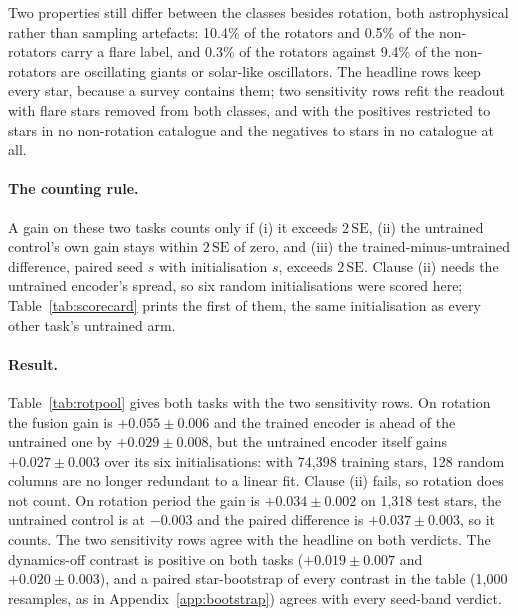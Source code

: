 \documentclass{article}
\begin{document}
Two properties still differ between the classes besides rotation, both astrophysical rather than
sampling artefacts: 10.4\% of the rotators and 0.5\% of the non-rotators carry a flare label, and
0.3\% of the rotators against 9.4\% of the non-rotators are oscillating giants or solar-like
oscillators. The headline rows keep every star, because a survey contains them; two sensitivity rows
refit the readout with flare stars removed from both classes, and with the positives restricted to
stars in no non-rotation catalogue and the negatives to stars in no catalogue at all.

\paragraph{The counting rule.} A gain on these two tasks counts only if (i) it exceeds
$2\,\mathrm{SE}$, (ii) the untrained control's own gain stays within $2\,\mathrm{SE}$ of zero, and
(iii) the trained-minus-untrained difference, paired seed $s$ with initialisation $s$, exceeds
$2\,\mathrm{SE}$. Clause (ii) needs the untrained encoder's spread, so six random initialisations
were scored here; Table~\ref{tab:scorecard} prints the first of them, the same initialisation as
every other task's untrained arm.

\paragraph{Result.} Table~\ref{tab:rotpool} gives both tasks with the two sensitivity rows. On
rotation the fusion gain is $+0.055 \pm 0.006$ and the trained encoder is ahead of the untrained one
by $+0.029 \pm 0.008$, but the untrained encoder itself gains $+0.027 \pm 0.003$ over its six
initialisations: with 74{,}398 training stars, 128 random columns are no longer redundant to a linear
fit. Clause (ii) fails, so rotation does not count. On rotation period the gain is $+0.034 \pm 0.002$
on 1{,}318 test stars, the untrained control is at $-0.003$ and the paired difference is
$+0.037 \pm 0.003$, so it counts. The two sensitivity rows agree with the headline on both verdicts.
The dynamics-off contrast is positive on both tasks ($+0.019 \pm 0.007$ and $+0.020 \pm 0.003$), and
a paired star-bootstrap of every contrast in the table (1{,}000 resamples, as in
Appendix~\ref{app:bootstrap}) agrees with every seed-band verdict.

\begin{table}[H]
\caption{The two rotation tasks on the rotation pool. The ``all stars'' rows are those of
Table~\ref{tab:scorecard}; linear and XGBoost readouts and the two supervised baselines are as there.
Gain = features\,$\oplus\,\mu$ minus features, mean over six encoder seeds, bold beyond
$2\,\mathrm{SE}$; untrained gain = the same with the untrained encoder. Sensitivity rows refit the
linear readout on the restricted population. $n$: test stars; prev.: rotator prevalence.}
\label{tab:rotpool}
\centering
\scriptsize

\end{table}
\end{document}
